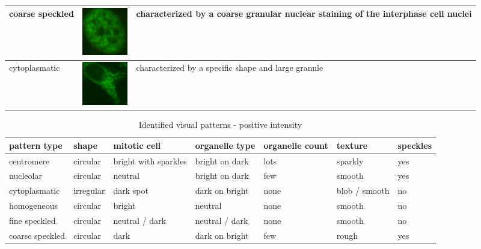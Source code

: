 \begin{table}
\begin{center}
\begin{tabular}{|m{2.3cm}|m{2.1cm}|m{8cm}|}
		coarse speckled & \vspace{5pt} \includegraphics[width=2cm]{Figures/describing/coarse_speckled} & characterized by a coarse granular nuclear staining of the interphase cell nuclei \\ \hline
		
		cytoplasmatic & \vspace{5pt} \includegraphics[width=2cm]{Figures/describing/cytoplasmatic} & characterized by a specific shape and large granule \\ \hline
	\end{tabular}
	\end{center}
\end{table}

\begin{table}
	\caption{Identified visual patterns - positive intensity}
	\label{tab:Vpata}
	\small
	\begin{tabular}{|m{2.2cm}|m{1.4cm}|m{1.5cm}|m{1.5cm}|m{1.4cm}|m{1.6cm}|m{1.4cm}|}
		\hline
		\textbf{pattern type} & \textbf{shape} & \textbf{mitotic cell} & \textbf{organelle type} & \textbf{organelle count} & \textbf{texture} & \textbf{speckles} \\ \hline
		centromere & circular & bright with sparkles & bright on dark & lots & sparkly  & yes \\ \hline
		nucleolar & circular & neutral & bright on dark & few & smooth & yes \\ \hline
		cytoplasmatic & irregular & dark spot & dark on bright & none & blob / smooth  & no \\ \hline
		homogeneous & circular & bright & neutral & none & smooth & no \\ \hline
		fine speckled & circular & neutral / dark & neutral / dark & none & smooth & no \\ \hline
		coarse speckled & circular & dark & dark on bright & few & rough & yes \\ \hline
	\end{tabular}
	\normalsize
\end{table}



